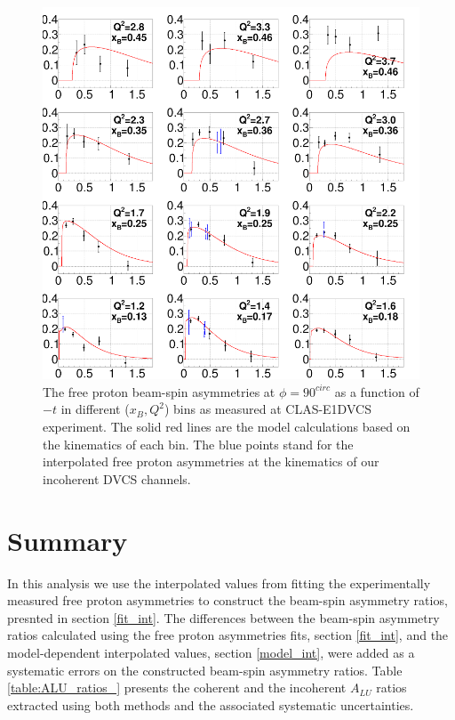 \begin{figure}[tpb]
   \centering
\includegraphics[scale=0.55]{fig_updated/From_FX_Check_Fit_6GeV_asym.png}
\caption{The free proton beam-spin asymmetries at $\phi = 90^{circ}$ as a 
function of $-t$ in different ($x_B, Q^2$) bins as measured at CLAS-E1DVCS 
experiment. The solid red lines are the model calculations based on the 
kinematics of each bin. The blue points stand for the interpolated free proton 
asymmetries at the kinematics of our incoherent DVCS channels.}
\label{fig:FXfree-proton-alu}
\end{figure}

\section{Summary}
In this analysis we use the interpolated values from fitting the experimentally 
measured free proton asymmetries to construct the beam-spin asymmetry ratios, 
presnted in section \ref{fit_int}.  The differences between the beam-spin 
asymmetry ratios calculated using the free proton asymmetries fits, section 
\ref{fit_int}, and the model-dependent interpolated values, section 
\ref{model_int}, were added as a systematic errors on the constructed beam-spin 
asymmetry ratios.  Table \ref{table:ALU_ratios_} presents the coherent and the 
incoherent $A_{LU}$ ratios extracted using both methods and the associated 
systematic uncertainties.

